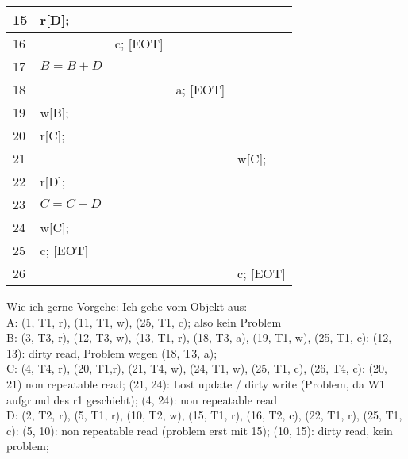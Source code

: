 \begin{tabular}{ | p{1cm} | p{2.8cm} | p{2.8cm} | p{2.8cm} | p{2.8cm} | }
	15            & r[D];        &              &              &              \\ \hline
	16            &              & c; [EOT]     &              &              \\ \hline
	17            & $B = B + D$  &              &              &              \\ \hline
	18            &              &              & a; [EOT]     &              \\ \hline
	19            & w[B];        &              &              &              \\ \hline
	20            & r[C];        &              &              &              \\ \hline
	21            &              &              &              & w[C];        \\ \hline
	22            & r[D];        &              &              &              \\ \hline
	23            & $C = C + D$  &              &              &              \\ \hline
	24            & w[C];        &              &              &              \\ \hline
	25            & c; [EOT]     &              &              &              \\ \hline
	26            &              &              &              & c; [EOT]     \\ \hline
\end{tabular}

\begin{note}
	Wie ich gerne Vorgehe: Ich gehe vom Objekt aus:\\
	A: (1, T1, r), (11, T1, w), (25, T1, c); also kein Problem\\
	B: (3, T3, r), (12, T3, w), (13, T1, r), (18, T3, a), (19, T1, w), (25, T1, c): (12, 13): dirty read, Problem wegen (18, T3, a);\\
	C: (4, T4, r), (20, T1,r), (21, T4, w), (24, T1, w), (25, T1, c), (26, T4, c): (20, 21) non repeatable read; (21, 24): Lost update / dirty write (Problem, da W1 aufgrund des r1 geschieht); (4, 24): non repeatable read\\
	D: (2, T2, r), (5, T1, r), (10, T2, w), (15, T1, r), (16, T2, c), (22, T1, r), (25, T1, c): (5, 10): non repeatable read (problem erst mit 15); (10, 15): dirty read, kein problem; 
\end{note}

